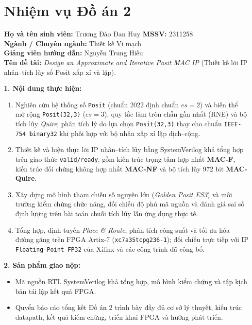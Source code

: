 \chapter*{Nhiệm vụ Đồ án 2}
\noindent\textbf{Họ và tên sinh viên:} Trương Đào Đan Huy \hfill \textbf{MSSV:} 2311258 \\
\textbf{Ngành / Chuyên ngành:} Thiết kế Vi mạch \\
\textbf{Giảng viên hướng dẫn:} Nguyễn Trung Hiếu \\
\textbf{Tên đề tài:} \textit{Design an Approximate and Iterative Posit MAC IP} (Thiết kế lõi IP nhân--tích lũy số Posit xấp xỉ và lặp).

\vspace{4mm}
\noindent\textbf{1. Nội dung thực hiện:}
\begin{enumerate}
  \item Nghiên cứu hệ thống số \texttt{Posit} (chuẩn 2022 định chuẩn $es=2$) và biến thể mở rộng \texttt{Posit(32,3)} ($es=3$), quy tắc làm tròn chẵn gần nhất (RNE) và bộ tích lũy \textit{Quire}; phân tích lý do lựa chọn \texttt{Posit(32,3)} thay cho chuẩn \texttt{IEEE-754 binary32} khi phối hợp với bộ nhân xấp xỉ lặp dịch--cộng.
  \item Thiết kế và hiện thực lõi IP nhân--tích lũy bằng SystemVerilog khả tổng hợp trên giao thức \texttt{valid/ready}, gồm kiến trúc trọng tâm hợp nhất \textbf{MAC-F}, kiến trúc đối chứng không hợp nhất \textbf{MAC-NF} và bộ tích lũy 972 bit \textbf{MAC-Quire}.
  \item Xây dựng mô hình tham chiếu số nguyên lớn (\textit{Golden Posit ES3}) và môi trường kiểm chứng chức năng, đối chiếu độ phủ mã nguồn và đánh giá sai số định lượng trên bài toán chuỗi tích lũy lẫn ứng dụng thực tế.
  \item Tổng hợp, định tuyến \textit{Place \& Route}, phân tích công suất và tối ưu hóa đường găng trên FPGA Artix-7 (\texttt{xc7a35tcpg236-1}); đối chiếu trực tiếp với IP \texttt{Floating-Point FP32} của Xilinx và các công trình đã công bố.
\end{enumerate}

\vspace{4mm}
\noindent\textbf{2. Sản phẩm giao nộp:}
\begin{itemize}
  \item Mã nguồn RTL SystemVerilog khả tổng hợp, mô hình kiểm chứng và tập kịch bản tái lập kết quả FPGA.
  \item Quyển báo cáo tổng kết Đồ án 2 trình bày đầy đủ cơ sở lý thuyết, kiến trúc datapath, kết quả kiểm chứng, triển khai FPGA và hướng phát triển.
\end{itemize}

